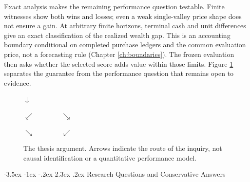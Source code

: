 \documentclass[12pt,a4paper,oneside]{report}
\makeatletter
\renewcommand\section{\@startsection{section}{1}{\z@}%
  {-3.5ex \@plus -1ex \@minus -.2ex}%
  {2.3ex \@plus .2ex}%
  {\normalfont\fontsize{14}{17}\selectfont\bfseries}}
\makeatother
\begin{document}
Exact analysis makes the remaining performance question testable. Finite
witnesses show both wins and losses; even a weak single-valley price shape
does not ensure a gain. At arbitrary finite horizons, terminal cash and unit
differences give an exact classification of the realized wealth gap. This is
an accounting boundary conditional on completed purchase ledgers and the
common evaluation price, not a forecasting rule (Chapter \ref{ch:boundaries}).
The frozen evaluation then asks whether the selected score adds value within
those limits. Figure \ref{fig:thesis-logic} separates the guarantee from the
performance question that remains open to evidence.

\begin{figure}[htbp]
\centering
\begingroup\small\singlespacing
{}
\par\smallskip $\downarrow$ \par\smallskip
{}
\par\smallskip $\swarrow\qquad\qquad\searrow$ \par\smallskip
{}
\hfill
{}
\par\smallskip $\searrow\qquad\qquad\swarrow$ \par\smallskip
{}
\endgroup
\caption{The thesis argument. Arrows indicate the route of the inquiry, not
causal identification or a quantitative performance model.}
\label{fig:thesis-logic}
\end{figure}
\FloatBarrier

\section{Research Questions and Conservative Answers}
\label{sec:introduction-questions}
\end{document}
